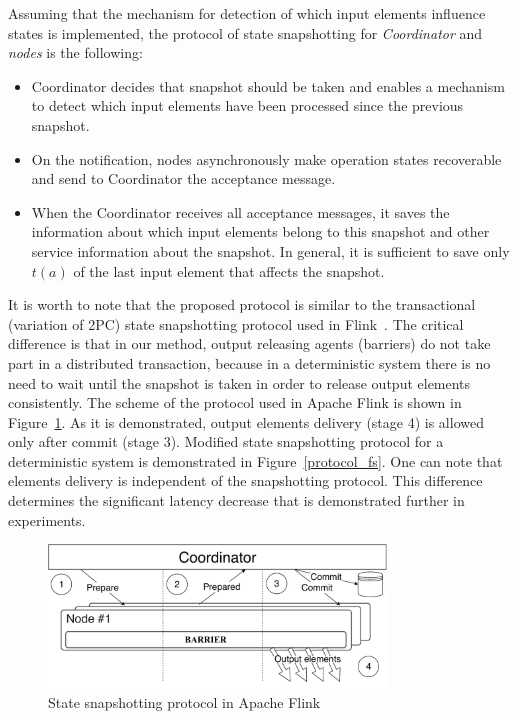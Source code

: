 Assuming that the mechanism for detection of which input elements influence states is implemented, the protocol of state snapshotting for {\em Coordinator} and {\em nodes} is the following:

\begin{itemize}
    \item Coordinator decides that snapshot should be taken and enables a mechanism to detect which input elements have been processed since the previous snapshot.
    \item On the notification, nodes asynchronously make operation states recoverable and send to Coordinator the acceptance message.
    \item When the Coordinator receives all acceptance messages, it saves the information about which input elements belong to this snapshot and other service information about the snapshot. In general, it is sufficient to save only $t(a)$ of the last input element that affects the snapshot.
\end{itemize}

It is worth to note that the proposed protocol is similar to the transactional (variation of 2PC) state snapshotting protocol used in Flink~\cite{Carbone:2017:SMA:3137765.3137777}. The critical difference is that in our method, output releasing agents (barriers) do not take part in a distributed transaction, because in a deterministic system there is no need to wait until the snapshot is taken in order to release output elements consistently. The scheme of the protocol used in Apache Flink is shown in Figure~\ref{protocol_flink}. As it is demonstrated, output elements delivery (stage 4) is allowed only after commit (stage 3). Modified state snapshotting protocol for a deterministic system is demonstrated in Figure~\ref{protocol_fs}. One can note that elements delivery is independent of the snapshotting protocol. This difference determines the significant latency decrease that is demonstrated further in experiments.

\begin{figure}[t]
  \centering
  \includegraphics[width=0.8\textwidth]{Chapters/DeterministicModelRuntime/pics/protocol-flink.pdf}
  \caption{State snapshotting protocol in Apache Flink}
  \label{protocol_flink}
\end{figure}

